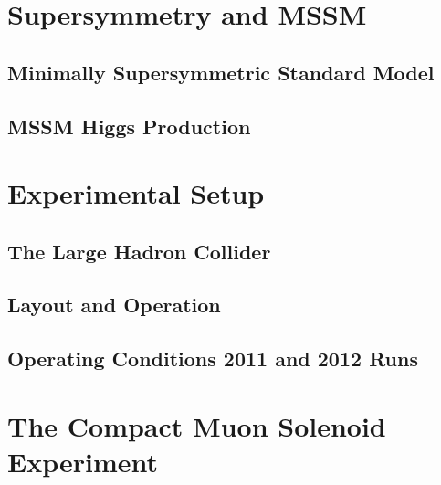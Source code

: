 \documentclass[oneside, letterpaper, 12pt, oldfontcommands]{memoir}
\begin{document}
\chapter{Supersymmetry and MSSM}
\section{Minimally Supersymmetric Standard Model}
\section{MSSM Higgs Production}

\chapter{Experimental Setup}
\section{The Large Hadron Collider}
\section{Layout and Operation}
\section{Operating Conditions 2011 and 2012 Runs}

\chapter{The Compact Muon Solenoid Experiment}
 
 
 
 
 
 
 
\end{document}
